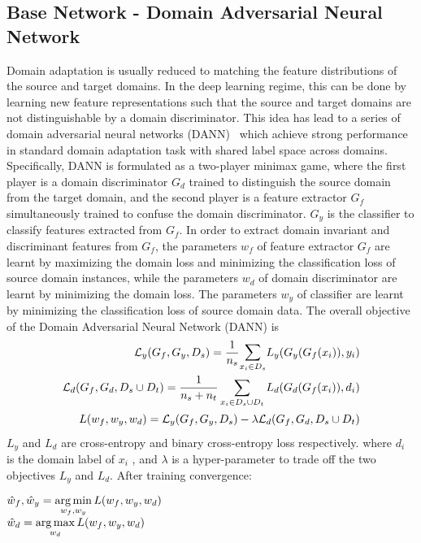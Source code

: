 \subsection{Base Network - Domain Adversarial Neural Network}
\label{subsec:dann}
Domain adaptation is usually reduced to matching the feature distributions of the source and target domains. In the deep learning regime, this can be done by
learning new feature representations such that the source and target domains
are not distinguishable by a domain discriminator. 
This idea has lead to a series of domain adversarial neural networks (DANN)~\cite{uda,dann,deeptransfer} which  achieve strong performance in standard domain adaptation task with shared label space across domains.
Specifically, DANN is formulated as a two-player minimax game, where the first player is
a domain discriminator $G_d$ trained to distinguish the source domain from the
target domain, and the second player is a feature extractor $G_f$ simultaneously
trained to confuse the domain discriminator. $G_y$ is the classifier to classify features extracted from $G_f$.
In order to extract domain invariant and discriminant features from $G_f$, the parameters $w_f$ of feature extractor $G_f$ are learnt by maximizing the domain loss and minimizing the classification loss of source domain instances, while the parameters $w_d$ of domain discriminator are learnt by minimizing the domain loss. The parameters $w_y$ of classifier are learnt by minimizing the classification loss of source domain data.
The overall objective of the Domain Adversarial Neural Network (DANN) is
\begin{equation}
\begin{align}
    \mathcal{L}_y(G_f, G_y, D_s)  = \dfrac{1}{n_{s}} \mathlarger\sum\limits_{x_i \in D_s} L_y(G_y(G_f(x_i)),y_i)\\
     \mathcal{L}_d(G_f, G_d, D_s \cup D_t) = \dfrac{1}{n_s + n_t} \sum\limits_{x_i \in {D_s \cup D_t}} L_d(G_d(G_f(x_i)),d_i)\\
     L(w_f, w_y, w_d) = \mathcal{L}_y(G_f, G_y, D_s) - \lambda \mathcal{L}_d(G_f, G_d, D_s \cup D_t)
\end{align}
\end{equation}
$L_y$ and $L_d$ are cross-entropy and binary cross-entropy loss respectively. where $d_i$ is the domain label of $x_i$ , and $\lambda$ is a hyper-parameter to trade off the
two objectives $L_y$ and $L_d$. After training convergence:
\begin{center}
    $\hat{w}_f, \hat{w}_y  = \operatorname*{arg\,min} \limits_{w_f, w_y} L(w_f, w_y, w_d)$\\
    $\hat{w}_d  = \operatorname*{arg\,max} \limits_{w_d} L(w_f, w_y, w_d)$
\end{center}


